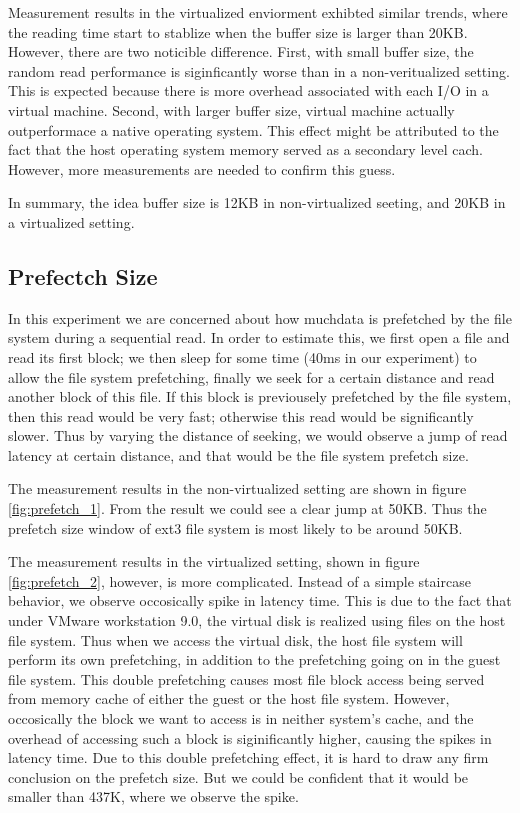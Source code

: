 Measurement results in the virtualized enviorment exhibted similar trends, where the reading time start to stablize when the buffer size is larger than 20KB. However, there are two noticible difference. First, with small buffer size, the random read performance is siginficantly worse than in a non-veritualized setting. This is expected because there is more overhead associated with each I/O in a virtual machine. Second, with larger buffer size, virtual machine actually outperformace a native operating system. This effect might be attributed to the fact that the host operating system memory served as a secondary level cach. However, more measurements are needed to confirm this guess. 

In summary, the idea buffer size is 12KB in non-virtualized seeting, and 20KB in a virtualized setting.

\subsection{Prefectch Size}
In this experiment we are concerned about how muchdata is prefetched by the file system during a sequential read. In order to estimate this, we first open a file and read its first block; we then sleep for some time (40ms in our experiment) to allow the file system prefetching, finally we seek for a certain distance and read another block of this file. If this block is previousely prefetched by the file system, then this read would be very fast; otherwise this read would be significantly slower. Thus by varying the distance of seeking, we would observe a jump of read latency at certain distance, and that would be the file system prefetch size. 

The measurement results in the non-virtualized setting are shown in figure \ref{fig:prefetch_1}. From the result we could see a clear jump at 50KB. Thus the prefetch size window of ext3 file system is most likely to be around 50KB.

The measurement results in the virtualized setting, shown in figure \ref{fig:prefetch_2}, however, is more complicated. Instead of a simple staircase behavior, we observe occosically spike in latency time. This is due to the fact that under VMware workstation 9.0, the virtual disk is realized using files on the host file system. Thus when we access the virtual disk, the host file system will perform its own prefetching, in addition to the prefetching going on in the guest file system. This double prefetching causes most file block access being served from memory cache of either the guest or the host file system. However, occosically the block we want to access is in neither system's cache, and the overhead of accessing such a block is siginificantly higher, causing the spikes in latency time. Due to this double prefetching effect, it is hard to draw any firm conclusion on the prefetch size. But we could be confident that it would be smaller than 437K, where we observe the spike. 


